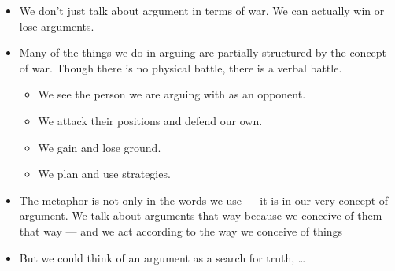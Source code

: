 \documentclass[headrule,footrule]{foils}
\begin{document}

\begin{exe}
\ex {}
\ex {}
\ex {}
\ex {}
\ex {}
\ex {}
\ex {}
\ex {}
\ex {}
\end{exe}
\newpage
\begin{itemize}
\item We don’t just talk about argument in terms of war. We can actually win or
lose arguments.
\item  Many of the things we do in arguing are partially structured by the concept of war.
Though there is no physical battle, there is a verbal battle.
\begin{itemize}
  \item  We see the person we are arguing with as an opponent.
  \item  We attack their positions and defend our own.
  \item  We gain and lose ground.
  \item  We plan and use strategies.
 \end{itemize}

\item The metaphor is not only in the words we use --- it is in our very concept of argument.  We talk about arguments that way because we conceive of them that way --- and we
act according to the way we conceive of things
\item But we could think of an argument as a search for truth, \ldots
\end{itemize}

\end{document}
